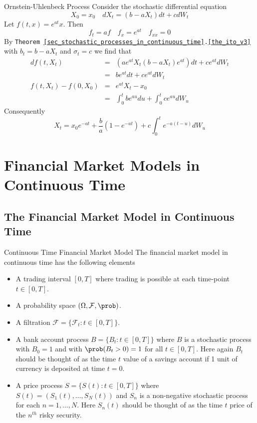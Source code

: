 \documentclass[11pt,a4paper]{article}
\begin{document}
  \begin{example}{Ornstein-Uhlenbeck Process}
    Consider the stochastic differential equation
    \[ X_0=x_0\quad dX_t=(b-aX_t)dt+cdW_t \]
    Let $f(t,x)=e^{at}x$. Then
    \[ f_t=af\quad f_x=e^{at}\quad f_{xx}=0 \]
    By \texttt{Theorem \ref{sec_stochastic_processes_in_continuous_time}.\ref{the_ito_v3}} with $b_t=b-aX_t$ and $\sigma_t=c$ we find that
    \[\begin{array}{rcl}
      df(t,X_t)&=&\left(ae^{at}X_t(b-aX_t)e^{at}\right)dt+ce^{at}dW_t\\
      &=&be^{at}dt+ce^{at}dW_t\\
      f(t,X_t)-f(0,X_0)&=&e^{at}X_t-x_0\\
      &=&\int_0^tbe^{au}du+\int_0^tce^{au}dW_u
    \end{array}\]
    Consequently
    \[ X_t=x_0e^{-at}+\frac{b}a\left(1-e^{-at}\right)+c\int_0^te^{-a(t-u)}dW_u \]
  \end{example}

\section{Financial Market Models in Continuous Time} \label{sec_financial_market_models_in_continuous_time}

\subsection{The Financial Market Model in Continuous Time}

  \begin{definition}{Continuous Time Financial Market Model}
    The financial market model in continuous time has the following elements
    \begin{itemize}
      \item A trading interval $[0,T]$ where trading is possible at each time-point $t\in[0,T]$.
      \item A probability space $(\Omega,\mathcal{F},\prob)$.
      \item A filtration $\mathcal{F}=\{\mathcal{F}_t:t\in[0,T]\}$.
      \item A bank account process $B=\{B_t:t\in[0,T]\}$ where $B$ is a stochastic process with $B_0=1$ and with $\prob(B_t>0)=1$ for all $t\in[0,T]$. Here again $B_t$ should be thought of as the time $t$ value of a savings account if 1 unit of currency is deposited at time $t=0$.
      \item A price process $S=\{S(t):t\in[0,T]\}$ where $S(t)=(S_1(t),\dots,S_N(t))$ and $S_n$ is a non-negative stochastic process for each $n=1,\dots,N$. Here $S_n(t)$ should be thought of as the time $t$ price of the $n^{th}$ risky security.
    \end{itemize}
  \end{definition}
\end{document}

